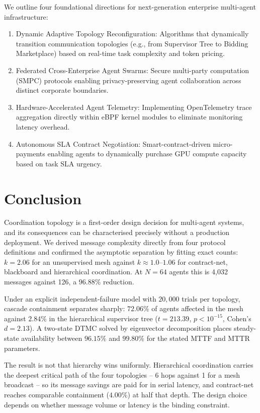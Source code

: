 \documentclass[10pt,journal,compsoc,twocolumn]{IEEEtran}
\begin{document}
We outline four foundational directions for next-generation enterprise multi-agent infrastructure:
\begin{enumerate}
  \item Dynamic Adaptive Topology Reconfiguration: Algorithms that dynamically transition communication topologies (e.g., from Supervisor Tree to Bidding Marketplace) based on real-time task complexity and token pricing.
  \item Federated Cross-Enterprise Agent Swarms: Secure multi-party computation (SMPC) protocols enabling privacy-preserving agent collaboration across distinct corporate boundaries.
  \item Hardware-Accelerated Agent Telemetry: Implementing OpenTelemetry trace aggregation directly within eBPF kernel modules to eliminate monitoring latency overhead.
  \item Autonomous SLA Contract Negotiation: Smart-contract-driven micro-payments enabling agents to dynamically purchase GPU compute capacity based on task SLA urgency.
\end{enumerate}




\section{Conclusion}


Coordination topology is a first-order design decision for multi-agent systems, and its consequences can be characterised precisely without a production deployment. We derived message complexity directly from four protocol definitions and confirmed the asymptotic separation by fitting exact counts: $k = 2.06$ for an unsupervised mesh against $k \approx 1.0$--$1.06$ for contract-net, blackboard and hierarchical coordination. At $N = 64$ agents this is 4{,}032 messages against 126, a $96.88\%$ reduction.

Under an explicit independent-failure model with $20{,}000$ trials per topology, cascade containment separates sharply: $72.06\%$ of agents affected in the mesh against $2.84\%$ in the hierarchical supervisor tree ($t = 213.39$, $p < 10^{-15}$, Cohen's $d = 2.13$). A two-state DTMC solved by eigenvector decomposition places steady-state availability between $96.15\%$ and $99.80\%$ for the stated MTTF and MTTR parameters.

The result is not that hierarchy wins uniformly. Hierarchical coordination carries the deepest critical path of the four topologies -- 6 hops against 1 for a mesh broadcast -- so its message savings are paid for in serial latency, and contract-net reaches comparable containment ($4.00\%$) at half that depth. The design choice depends on whether message volume or latency is the binding constraint.
\end{document}
